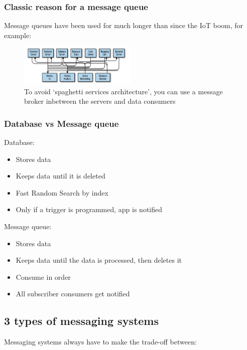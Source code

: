 \documentclass{article}
\begin{document}
\subsubsection{Classic reason for a message queue}

Message queues have been used for much longer than since the IoT boom, for example:

\begin{figure}[H]
    \centering
    \includegraphics[width=0.5\textwidth]{msg-queue-spaghetti.png}
    \caption{To avoid `spaghetti services architecture', you can use a message broker inbetween the servers and data consumers}
\end{figure}

\subsubsection{Database vs Message queue}

Database:

\begin{itemize}
    \item Stores data
    \item Keeps data until it is deleted
    \item Fast Random Search by index
    \item Only if a trigger is programmed, app is notified
\end{itemize}

Message queue:

\begin{itemize}
    \item Stores data
    \item Keeps data until the data is processed, then deletes it
    \item Consume in order
    \item All subscriber consumers get notified
\end{itemize}

\subsection{3 types of messaging systems}

Messaging systems always have to make the trade-off between:
\end{document}
